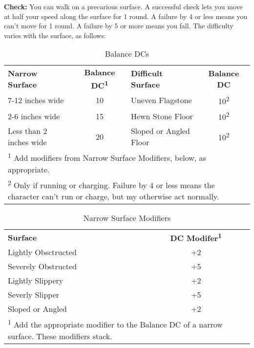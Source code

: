 
\textbf{Check:} You can walk on a precarious surface. A successful check lets you 
move at half your speed along the surface for 1 round. A failure by 4 or less means 
you can't move for 1 round. A failure by 5 or more means you fall. The difficulty 
varies with the surface, as follows:

\begin{table}[htb]
\caption{Balance DCs}
\centering
\begin{tabular}{l c l c}
\textbf{Narrow Surface} & \textbf{Balance DC\textsuperscript{1}} & \textbf{Difficult Surface} & \textbf{Balance DC}\\
7-12 inches wide & 10 & Uneven Flagstone & 10\textsuperscript{2}\\
2-6 inches wide & 15 & Hewn Stone Floor & 10\textsuperscript{2}\\
Less than 2 inches wide & 20 & Sloped or Angled Floor & 10\textsuperscript{2}\\
\multicolumn{4}{p{11cm}}{\textsuperscript{1} Add modifiers from Narrow Surface Modifiers, below, as appropriate.}\\
\multicolumn{4}{p{11cm}}{\textsuperscript{2} Only if running or charging. Failure by 4 or less means the character can't run or charge, but my otherwise act normally.}\\
\end{tabular}
\end{table}

\begin{table}[htb]
\caption{Narrow Surface Modifiers}
\centering
\begin{tabular}{l c}
\textbf{Surface} & \textbf{DC Modifer\textsuperscript{1}}\\
Lightly Obsctructed & +2\\
Severely Obstructed & +5\\
Lightly Slippery & +2\\
Severly Slipper & +5\\
Sloped or Angled & +2\\
\multicolumn{2}{p{7cm}}{\textsuperscript{1} Add the appropriate modifier to the Balance DC of a narrow surface. These modifiers stack.}\\
\end{tabular}
\end{table}

